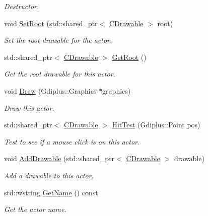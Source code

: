 \begin{DoxyCompactItemize}
\begin{DoxyCompactList}\small\item\em Destructor. \end{DoxyCompactList}\item 
void \hyperlink{class_c_actor_af0417205281ecd3bc52a367724cc6635}{Set\+Root} (std\+::shared\+\_\+ptr$<$ \hyperlink{class_c_drawable}{C\+Drawable} $>$ root)
\begin{DoxyCompactList}\small\item\em Set the root drawable for the actor. \end{DoxyCompactList}\item 
std\+::shared\+\_\+ptr$<$ \hyperlink{class_c_drawable}{C\+Drawable} $>$ \hyperlink{class_c_actor_aa37de0f063ac679e7f2183cfbba2148d}{Get\+Root} ()
\begin{DoxyCompactList}\small\item\em Get the root drawable for this actor. \end{DoxyCompactList}\item 
void \hyperlink{class_c_actor_a78048c684b231e498184d963b57fffe2}{Draw} (Gdiplus\+::\+Graphics $\ast$graphics)
\begin{DoxyCompactList}\small\item\em Draw this actor. \end{DoxyCompactList}\item 
std\+::shared\+\_\+ptr$<$ \hyperlink{class_c_drawable}{C\+Drawable} $>$ \hyperlink{class_c_actor_a63676c04fa760cd9fc56d85cb0542cd1}{Hit\+Test} (Gdiplus\+::\+Point pos)
\begin{DoxyCompactList}\small\item\em Test to see if a mouse click is on this actor. \end{DoxyCompactList}\item 
void \hyperlink{class_c_actor_a943e05a65bde59998079ab647ec0e7ec}{Add\+Drawable} (std\+::shared\+\_\+ptr$<$ \hyperlink{class_c_drawable}{C\+Drawable} $>$ drawable)
\begin{DoxyCompactList}\small\item\em Add a drawable to this actor. \end{DoxyCompactList}\item 
std\+::wstring \hyperlink{class_c_actor_aee85c15c97f5f9652cb4c083772798e6}{Get\+Name} () const 
\begin{DoxyCompactList}\small\item\em Get the actor name. \end{DoxyCompactList}\item 

\end{DoxyCompactItemize}
